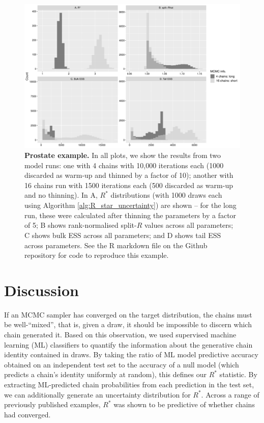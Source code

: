 \documentclass{article}
\begin{document}
\begin{figure}[!htb]
	\centerline{\includegraphics[width=1.0\textwidth]{../output/prostate.pdf}}
	\caption{\textbf{Prostate example.} In all plots, we show the results from two model runs: one with 4 chains with 10,000 iterations each (1000 discarded as warm-up and thinned by a factor of 10); another with 16 chains run with 1500 iterations each (500 discarded as warm-up and no thinning). In A, $R^*$ distributions (with 1000 draws each using Algorithm \ref{alg:R_star_uncertainty}) are shown -- for the long run, these were calculated after thinning the parameters by a factor of 5; B shows rank-normalised split-$\widehat{R}$ values across all parameters; C shows bulk ESS across all parameters; and D shows tail ESS across parameters. See the R markdown file on the Github repository for code to reproduce this example.}
	\label{fig:prostate}
\end{figure}

\section{Discussion}
If an MCMC sampler has converged on the target distribution, the chains must be well-``mixed'', that is, given a draw, it should be impossible to discern which chain generated it. Based on this observation, we used supervised machine learning (ML) classifiers to quantify the information about the generative chain identity contained in draws. By taking the ratio of ML model predictive accuracy obtained on an independent test set to the accuracy of a null model (which predicts a chain's identity uniformly at random), this defines our $R^*$ statistic. By extracting ML-predicted chain probabilities from each prediction in the test set, we can additionally generate an uncertainty distribution for $R^*$. Across a range of previously published examples, $R^*$ was shown to be predictive of whether chains had converged.
\end{document}
